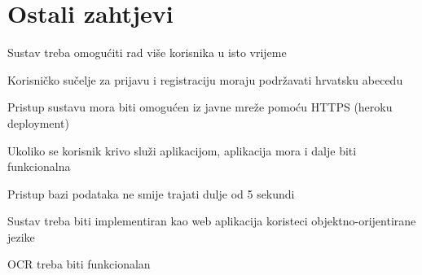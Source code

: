 		\section{Ostali zahtjevi}
			\begin{packed_item}
				 \item {Sustav treba omogućiti rad više korisnika u isto vrijeme}
				 \item {Korisničko sučelje za prijavu i registraciju moraju podržavati hrvatsku abecedu}
				 \item {Pristup sustavu mora biti omogućen iz javne mreže pomoću HTTPS (heroku deployment)}
				 \item {Ukoliko se korisnik krivo služi aplikacijom, aplikacija mora i dalje biti funkcionalna}
				 \item {Pristup bazi podataka ne smije trajati dulje od 5 sekundi}
				 \item {Sustav treba biti implementiran kao web aplikacija koristeci objektno-orijentirane jezike}
				 \item {OCR treba biti funkcionalan}
			\end{packed_item}
				
			 
			 
			 
			 
	